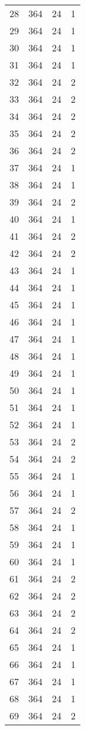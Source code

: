 \begin{longtable}[!]{c|ccc}
	28	& 364	& 24	& 1	\\
	29	& 364	& 24	& 1	\\
	30	& 364	& 24	& 1	\\
	31	& 364	& 24	& 1	\\
	32	& 364	& 24	& 2	\\
	33	& 364	& 24	& 2	\\
	34	& 364	& 24	& 2	\\
	35	& 364	& 24	& 2	\\
	36	& 364	& 24	& 2	\\
	37	& 364	& 24	& 1	\\
	38	& 364	& 24	& 1	\\
	39	& 364	& 24	& 2	\\
	40	& 364	& 24	& 1	\\
	41	& 364	& 24	& 2	\\
	42	& 364	& 24	& 2	\\
	43	& 364	& 24	& 1	\\
	44	& 364	& 24	& 1	\\
	45	& 364	& 24	& 1	\\
	46	& 364	& 24	& 1	\\
	47	& 364	& 24	& 1	\\
	48	& 364	& 24	& 1	\\
	49	& 364	& 24	& 1	\\
	50	& 364	& 24	& 1	\\
	51	& 364	& 24	& 1	\\
	52	& 364	& 24	& 1	\\
	53	& 364	& 24	& 2	\\
	54	& 364	& 24	& 2	\\
	55	& 364	& 24	& 1	\\
	56	& 364	& 24	& 1	\\
	57	& 364	& 24	& 2	\\
	58	& 364	& 24	& 1	\\
	59	& 364	& 24	& 1	\\
	60	& 364	& 24	& 1	\\
	61	& 364	& 24	& 2	\\
	62	& 364	& 24	& 2	\\
	63	& 364	& 24	& 2	\\
	64	& 364	& 24	& 2	\\
	65	& 364	& 24	& 1	\\
	66	& 364	& 24	& 1	\\
	67	& 364	& 24	& 1	\\
	68	& 364	& 24	& 1	\\
	69	& 364	& 24	& 2	\\

\end{longtable}
